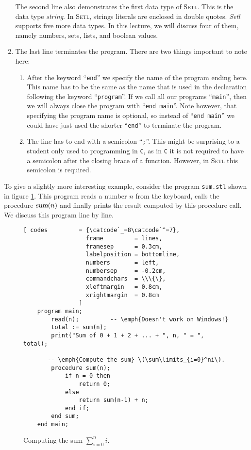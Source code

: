 \begin{enumerate}
      The second line also demonstrates the first data type of \textsc{Setl}. This is the
      data type \emph{string}.  In \textsc{Setl}, strings literals are enclosed in double
      quotes.  \textsl{Setl} supports five more data types.  In this lecture, we
      will discuss four of them, namely numbers, sets, lists, and boolean values.
\item The last line terminates the program.  There are two things important to note here:
      \begin{enumerate}
      \item After the keyword ``\texttt{end}'' we  specify the name of the program
            ending here.  This name has to be the same as the name that is used in the
            declaration following the keyword ``\texttt{program}''.  If we call all our
            programs ``\texttt{main}'', then we will always close the program with
            ``\texttt{end main}''.  Note however, that specifying the program name is
            optional, so instead of ``\texttt{end main}'' we could have just used
            the shorter ``\texttt{end}'' to terminate the program.
      \item The line has to end with a semicolon ``\texttt{;}''.  This might be surprising to a 
            student only used to programming in \texttt{C}, as in \texttt{C} it is not required to have
            a semicolon after the closing brace of a function.  However, in \textsc{Setl}
            this semicolon is required.
      \end{enumerate}
\end{enumerate}
To give a slightly more interesting example, consider the  program \texttt{sum.stl} shown
in figure \ref{fig:sum.stl}.  This program reads a number $n$ from the keyboard, calls the
procedure $\textsl{sum}(n)$ and finally prints the result computed by this procedure call.
We discuss this program line by line.

\begin{figure}[!ht]
  \centering
\begin{Verbatim}[ codes         = {\catcode`_=8\catcode`^=7},
                  frame         = lines, 
                  framesep      = 0.3cm, 
                  labelposition = bottomline,
                  numbers       = left,
                  numbersep     = -0.2cm,
                  commandchars  = \\\{\},
                  xleftmargin   = 0.8cm,
                  xrightmargin  = 0.8cm
                ]
    program main;
        read(n);         -- \emph{Doesn't work on Windows!}
        total := sum(n);
        print("Sum of 0 + 1 + 2 + ... + ", n, " = ", total);

       -- \emph{Compute the sum} \(\sum\limits_{i=0}^ni\).
        procedure sum(n);
            if n = 0 then 
                return 0;
            else
                return sum(n-1) + n;
            end if;
        end sum;
    end main;
\end{Verbatim} 
\vspace*{-0.3cm}
  \caption{Computing the sum $\sum\limits_{i=0}^ni$.}
  \label{fig:sum.stl}
\end{figure} 

